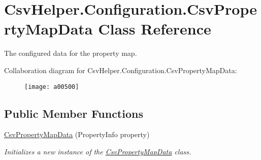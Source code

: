 \hypertarget{a00075}{\section{Csv\-Helper.\-Configuration.\-Csv\-Property\-Map\-Data Class Reference}
\label{a00075}
}


The configured data for the property map.  




Collaboration diagram for Csv\-Helper.\-Configuration.\-Csv\-Property\-Map\-Data\-:
\nopagebreak
\begin{figure}[H]
\begin{center}
\leavevmode
\texttt{[image: a00500]}
\end{center}
\end{figure}
\subsection*{Public Member Functions}
\begin{DoxyCompactItemize}
\item 
\hyperlink{a00075_a1a1424683bea80f373e3ea80ae6e39c7}{Csv\-Property\-Map\-Data} (Property\-Info property)
\begin{DoxyCompactList}\small\item\em Initializes a new instance of the \hyperlink{a00075}{Csv\-Property\-Map\-Data} class. \end{DoxyCompactList}\end{DoxyCompactItemize}
